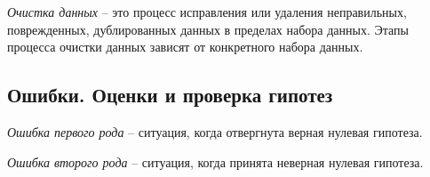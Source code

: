 \begin{definition}
  \emph{Очистка данных} -- это процесс исправления или удаления неправильных, поврежденных, дублированных данных в пределах набора данных. Этапы процесса очистки данных зависят от конкретного набора данных.
\end{definition}

\subsection{Ошибки. Оценки и проверка гипотез}

\begin{definition}
  \emph{Ошибка первого рода} -- ситуация, когда отвергнута верная нулевая гипотеза.
\end{definition}

\begin{definition}
  \emph{Ошибка второго рода} -- ситуация, когда принята неверная нулевая гипотеза.
\end{definition}
